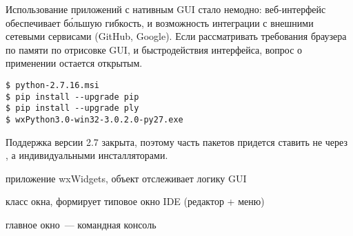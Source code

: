 \label{wx}\secdown

\noindent
Использование приложений с нативным GUI стало немодно: веб-интер\-фейс
обеспечивает б\'{о}льшую гибкость, и возможность
интеграции с внешними сетевыми сервисами (GitHub, Google). Если рассматривать
требования браузера по памяти по отрисовке GUI, и быстродействия интерфейса,
вопрос о применении  остается открытым.


\begin{verbatim}
$ python-2.7.16.msi
$ pip install --upgrade pip
$ pip install --upgrade ply
$ wxPython3.0-win32-3.0.2.0-py27.exe
\end{verbatim}

\noindent
Поддержка версии 2.7 закрыта, поэтому часть пакетов придется ставить не через
, а индивидуальными инсталляторами.


\clearpage
{}

\begin{description}[nosep]
\item[ide] приложение wxWidgets, объект отслеживает логику GUI
\item[ideWindow] класс окна, формирует типовое окно IDE (редактор + меню)
\item[ideConsole] главное окно\ --- командная консоль
\end{description}



\clearpage
{}

\secup
